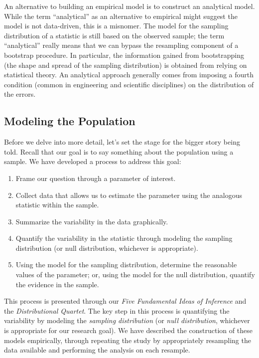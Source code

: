 \documentclass[
  letterpaper,
  DIV=11,
  numbers=noendperiod]{scrreprt}
\providecommand{\tightlist}{%
  \setlength{\itemsep}{0pt}\setlength{\parskip}{0pt}}\usepackage{longtable,booktabs,array}
\theoremstyle{plain}
\theoremstyle{definition}
\theoremstyle{definition}
\theoremstyle{remark}
\begin{document}
An alternative to building an empirical model is to construct an
analytical model. While the term ``analytical'' as an alternative to
empirical might suggest the model is not data-driven, this is a
misnomer. The model for the sampling distribution of a statistic is
still based on the observed sample; the term ``analytical'' really means
that we can bypass the resampling component of a bootstrap procedure. In
particular, the information gained from bootstrapping (the shape and
spread of the sampling distribution) is obtained from relying on
statistical theory. An analytical approach generally comes from imposing
a fourth condition (common in engineering and scientific disciplines) on
the distribution of the errors.

\subsection{Modeling the Population}\label{modeling-the-population}

Before we delve into more detail, let's set the stage for the bigger
story being told. Recall that our goal is to say something about the
population using a sample. We have developed a process to address this
goal:

\begin{enumerate}
\def\labelenumi{\arabic{enumi}.}
\tightlist
\item
  Frame our question through a parameter of interest.
\item
  Collect data that allows us to estimate the parameter using the
  analogous statistic within the sample.
\item
  Summarize the variability in the data graphically.
\item
  Quantify the variability in the statistic through modeling the
  sampling distribution (or null distribution, whichever is
  appropriate).
\item
  Using the model for the sampling distribution, determine the
  reasonable values of the parameter; or, using the model for the null
  distribution, quantify the evidence in the sample.
\end{enumerate}

This process is presented through our \emph{Five Fundamental Ideas of
Inference} and the \emph{Distributional Quartet}. The key step in this
process is quantifying the variability by modeling the \emph{sampling
distribution} (or \emph{null distribution}, whichever is appropriate for
our research goal). We have described the construction of these models
empirically, through repeating the study by appropriately resampling the
data available and performing the analysis on each resample.
\end{document}
